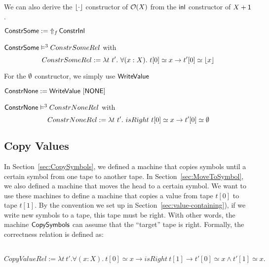 We can also derive the $\Some{\cdot}$ constructor of $\Option(X)$ from the $\inl$ constructor of $X+\Unit$.
\begin{definition}[$\MS{ConstrSome}$]
  \label{def:Constr_Some}
  $\MS{ConstrSome} := \LiftAlphabet{\MS{ConstrInl}}{f}$
\end{definition}
\begin{lemma}
  \label{lem:Constr_Some_Sem}
  $\MS{ConstrSome} \RealiseIn{3} ConstrSomeRel$ with
  \[
    ConstrSomeRel := \lambda t~t'.~\forall(x:X).~t[0] \simeq x \rightarrow t'[0] \simeq \Some{x}
  \]
\end{lemma}
For the $\None$ constructor, we simply use $\MS{WriteValue}$
\begin{definition}[$\MS{ConstrNone}$]
  \label{def:Constr_None}
  $\MS{ConstrNone} := \MS{WriteValue}~[\MS{NONE}]$
\end{definition}
\begin{lemma}
  \label{lem:Constr_None_Sem}
  $\MS{ConstrNone} \RealiseIn{3} ConstrNoneRel$ with
  \[
    ConstrNoneRel := \lambda t~t'.~isRight~t[0] \simeq x \rightarrow t'[0] \simeq \None
  \]
\end{lemma}



\subsection{Copy Values}
\label{sec:copy}

In Section~\ref{sec:CopySymbols}, we defined a machine that copies symbols until a certain symbol from one tape to another tape.  In
Section~\ref{sec:MoveToSymbol}, we also defined a machine that moves the head to a certain symbol.  We want to use these machines to define a machine
that copies a value from tape $t[0]$ to tape $t[1]$.  By the convention we set up in Section~\ref{sec:value-containing}), if we write new symbols to a
tape, this tape must be right.  With other words, the machine $\MS{CopySymbols}$ can assume that the ``target'' tape is right.  Formally, the
correctness relation is defined as:
\begin{definition}
  \label{def:CopyValue_Rel}
  ~
  \[
    CopyValueRel := \lambda t~t'. \forall (x:X).~t[0] \simeq x \rightarrow isRight~t[1] \rightarrow t'[0] \simeq x \land t'[1] \simeq x.
  \]
\end{definition}

